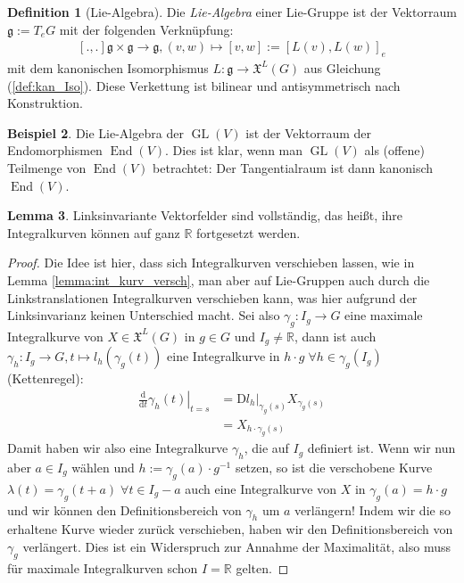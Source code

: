 \documentclass[a4paper]{scrreprt}
\numberwithin{equation}{chapter}
\newcommand{\D}{\mathrm{d}}
\newcommand{\DD}{\mathrm{D}}
\DeclareMathOperator{\GL}{GL}
\DeclareMathOperator{\End}{End}
\newcommand{\R}{\mathbb{R}}
\newcommand{\vf}{\mathfrak{X}}
\theoremstyle{definition}
\newtheorem{defn}{Definition}[section]
\newtheorem{lemma}[defn]{Lemma}
\newtheorem{bsp}[defn]{Beispiel}
\begin{document}
		\begin{defn}[Lie-Algebra]
			Die \emph{Lie-Algebra} einer Lie-Gruppe ist der Vektorraum $\mathfrak{g}:=T_eG$ mit der folgenden Verknüpfung:
			\begin{align*}
				\left[.,.\right]\mathfrak{g}\times \mathfrak{g}\rightarrow \mathfrak{g}, (v,w)\mapsto \left[v,w\right]:=\left[L(v),L(w)\right]_e
			\end{align*}
			mit dem kanonischen Isomorphismus $L\colon \mathfrak{g}\to \vf^L(G)$ aus Gleichung (\ref{def:kan_Iso}). Diese Verkettung ist bilinear und antisymmetrisch nach Konstruktion.
		\end{defn}
		\begin{bsp}\hfill
			Die Lie-Algebra der $\GL(V)$ ist der Vektorraum der Endomorphismen $\End(V)$. Dies ist klar, wenn man $\GL(V)$ als (offene) Teilmenge von $\End(V)$ betrachtet: Der Tangentialraum ist dann kanonisch $\End(V)$.
		\end{bsp}
		\begin{lemma}
			Linksinvariante Vektorfelder sind vollständig, das heißt, ihre Integralkurven können auf ganz $\R$ fortgesetzt werden.
			\begin{proof}
			Die Idee ist hier, dass sich Integralkurven verschieben lassen, wie in Lemma \ref{lemma:int_kurv_versch}, man aber auf Lie-Gruppen auch durch die Linkstranslationen Integralkurven verschieben kann, was hier aufgrund der Linksinvarianz keinen Unterschied macht. Sei also $\gamma_g\colon I_g\rightarrow G$ eine maximale Integralkurve von $X\in\vf^L(G)$ in $g\in G$ und $I_g\neq \R$, dann ist auch $\gamma_h\colon I_g\rightarrow G, t\mapsto l_h(\gamma_g(t))$ eine Integralkurve in $h\cdot g\;\forall h\in\gamma_g(I_g)$ (Kettenregel):
			\begin{align*}
				\left.\frac{\D}{\D t}\gamma_h(t)\right\vert_{t=s}&=\DD l_h\vert_{\gamma_g(s)} X_{\gamma_g(s)}\\
				&=X_{h\cdot \gamma_g(s)}
			\end{align*}
			Damit haben wir also eine Integralkurve $\gamma_h$, die auf $I_g$ definiert ist. Wenn wir nun aber $a \in I_g$ wählen und $h := \gamma_g(a) \cdot g^{-1}$ setzen, so ist die verschobene Kurve $\lambda(t)=\gamma_g(t+a)\;\forall t\in I_g-a$ auch eine Integralkurve von $X$ in $\gamma_g(a) = h \cdot g$ und wir können den Definitionsbereich von $\gamma_h$ um $a$ verlängern! Indem wir die so erhaltene Kurve wieder zurück verschieben, haben wir den Definitionsbereich von $\gamma_g$ verlängert. Dies ist ein Widerspruch zur Annahme der Maximalität, also muss für maximale Integralkurven schon $I=\R$ gelten.
			\end{proof}
		\end{lemma}
\end{document}
